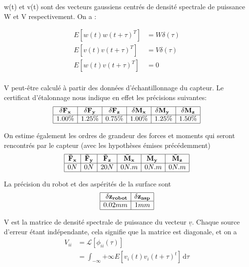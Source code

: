 \documentclass[12pt,twoside,a4paper]{article}
\newcommand\ul[1]{\underline{#1}}
\begin{document}
 \vspace{0.5cm}


w(t) et v(t) sont des vecteurs gaussiens centrés de densité spectrale de puissance W et V respectivement. On a :

$$
\begin{array}{ll}
E[w(t) w(t+\tau)^T ] &= W \delta(\tau) \\
E[v(t) v(t+\tau)^T ] &= V \delta(\tau)  \\
E[w(t) v(t+\tau)^T ] &= 0  \\
\end{array}
$$

\vspace{1cm}

V peut-être calculé à partir des données d'échantillonnage du capteur. Le certificat d'étalonnage nous indique en effet les précisions suivantes:
$$
\begin{array}{|c|c|c|c|c|c|}
	\hline
	\bold{\delta F_x} & \bold{\delta F_y} & \bold{\delta F_z} & \bold{\delta M_x} & \bold{\delta M_y} & \bold{\delta M_z} \\
	\hline
	1.00\% & 1.25\% & 0.75\% & 1.00\% & 1.25\% & 1.50\% \\
	\hline
\end{array}
$$

On estime également les ordres de grandeur des forces et moments qui seront rencontrés par le capteur (avec les hypothèses émises précédemment)
$$
\begin{array}{|c|c|c|c|c|c|}
	\hline
	\bold{\bar{F}_x} & \bold{\bar{F}_y} & \bold{\bar{F}_z} & \bold{\bar{M}_x} & \bold{\bar{M}_y} & \bold{\bar{M}_z} \\
	\hline
	0N & 0N & 20N & 0N.m & 0N.m & 0N.m \\
	\hline
\end{array}
$$

La précision du robot et des aspérités de la surface sont
$$
\begin{array}{|c|c|}
\hline 
\bold{\delta z_{robot}} & \bold{\delta z_{asp}} \\
\hline
0.02mm & 1mm \\
\hline
\end{array}
$$


\vspace{1cm}
V est la matrice de densité spectrale de puissance du vecteur $\ul{v}$. Chaque source d'erreur étant indépendante, cela signifie que la matrice est diagonale, et on a
$$
\begin{array}{ll}
V_{ii} &= \mathcal{L}[\phi_{ii}(\tau)] \\
&= \int_{-\infty}{+\infty} E[v_{i}(t)v_{i}(t+\tau)^{t}] \, \mathrm{d}\tau
\end{array}
$$
\end{document}

